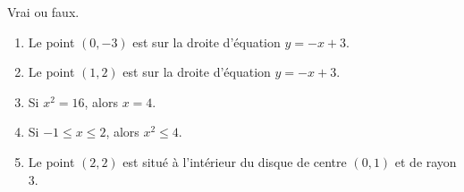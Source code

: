 
\begin{exercice}\label{exosmath-0345}

    Vrai ou faux.
    \begin{multicols}{2}
        \begin{enumerate}
            \item
                Le point $(0,-3)$ est sur la droite d'équation \( y=-x+3\).
            \item
                Le point $(1,2)$ est sur la droite d'équation \( y=-x+3\).
            \item
                Si \( x^2=16\), alors \( x=4\).
            \item
                Si \( -1\leq x\leq 2\), alors \( x^2\leq 4\).
            \item
                Le point \( (2,2)\) est situé à l'intérieur du disque de centre \( (0,1)\) et de rayon \( 3\).
        \end{enumerate}
    \end{multicols}

\end{exercice}
